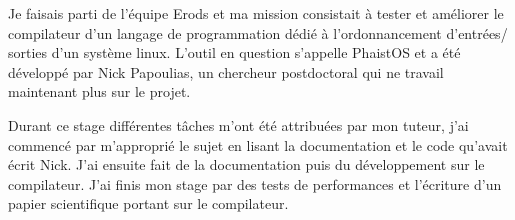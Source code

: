 \begin{titlepage}
{Je faisais parti de l'équipe Erods et ma mission consistait à tester et 
améliorer le compilateur d'un langage de programmation dédié à l'ordonnancement 
d'entrées/ sorties d'un système linux. L'outil en question s'appelle PhaistOS 
et a été développé par Nick Papoulias, un chercheur postdoctoral qui ne travail 
maintenant plus sur le projet.

Durant ce stage différentes tâches m'ont été attribuées par mon tuteur, j'ai 
commencé par m'approprié le sujet en lisant la documentation et le code 
qu'avait écrit Nick. J'ai ensuite fait de la documentation puis du 
développement sur le compilateur. J'ai finis mon stage par des tests de 
performances et l'écriture d'un papier scientifique portant sur le compilateur.}

\end{titlepage}